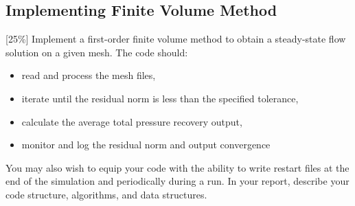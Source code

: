\pagebreak
\subsection{Implementing Finite Volume Method}
[25\%] Implement a first-order finite volume method to obtain a steady-state flow solution on a given mesh. The code should:

\begin{itemize}
    \item read and process the mesh files,
    \item iterate until the residual norm is less than the specified tolerance,
    \item calculate the average total pressure recovery output,
    \item monitor and log the residual norm and output convergence
\end{itemize}

You may also wish to equip your code with the ability to write restart files at the end of
the simulation and periodically during a run. In your report, describe your code structure,
algorithms, and data structures.